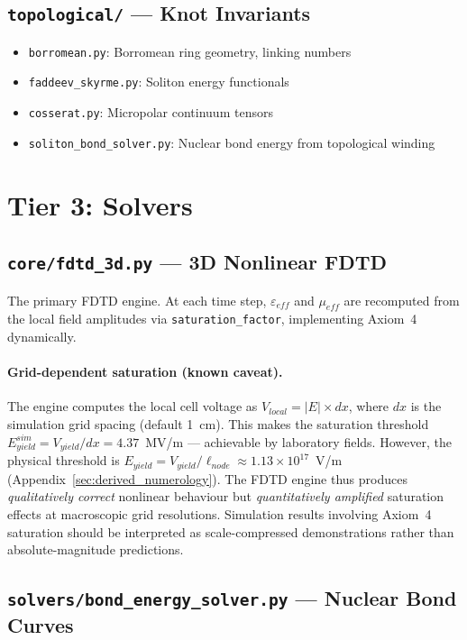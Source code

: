 \subsection{\texttt{topological/} --- Knot Invariants}

\begin{itemize}
    \item \texttt{borromean.py}: Borromean ring geometry, linking numbers
    \item \texttt{faddeev\_skyrme.py}: Soliton energy functionals
    \item \texttt{cosserat.py}: Micropolar continuum tensors
    \item \texttt{soliton\_bond\_solver.py}: Nuclear bond energy from
          topological winding
\end{itemize}


\section{Tier 3: Solvers}
\label{sec:tier3_solvers}

\subsection{\texttt{core/fdtd\_3d.py} --- 3D Nonlinear FDTD}

The primary FDTD engine.  At each time step, $\varepsilon_{eff}$
and $\mu_{eff}$ are recomputed from the local field amplitudes via
\texttt{saturation\_factor}, implementing Axiom~4 dynamically.

\paragraph{Grid-dependent saturation (known caveat).}
The engine computes the local cell voltage as $V_{local} = |E| \times dx$, where $dx$ is the simulation grid spacing (default 1~cm).  This makes the saturation threshold $E_{yield}^{sim} = V_{yield}/dx = 4.37$~MV/m --- achievable by laboratory fields.  However, the physical threshold is $E_{yield} = V_{yield}/\ell_{node} \approx 1.13 \times 10^{17}$~V/m (Appendix~\ref{sec:derived_numerology}).  The FDTD engine thus produces \textit{qualitatively correct} nonlinear behaviour but \textit{quantitatively amplified} saturation effects at macroscopic grid resolutions.  Simulation results involving Axiom~4 saturation should be interpreted as scale-compressed demonstrations rather than absolute-magnitude predictions.

\subsection{\texttt{solvers/bond\_energy\_solver.py} --- Nuclear Bond Curves}

